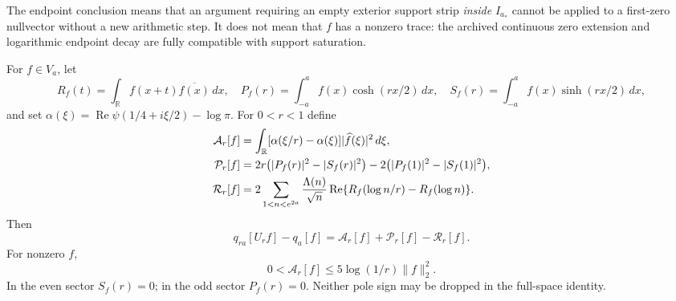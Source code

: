 The endpoint conclusion means that an argument requiring an empty
exterior support strip \emph{inside} $I_{a_*}$ cannot be applied to
a first-zero nullvector without a new arithmetic step. It does not
mean that $f$ has a nonzero trace: the archived continuous zero
extension and logarithmic endpoint decay are fully compatible with
support saturation.

\begin{proposition}
\label{prop:ns55fc-dilation}
For $f\in V_a$, let
\[
 R_f(t)=\int_{\mathbb R}f(x+t)\overline{f(x)}\,dx,
 \quad P_f(r)=\int_{-a}^a f(x)\cosh(rx/2)\,dx,
 \quad S_f(r)=\int_{-a}^a f(x)\sinh(rx/2)\,dx,
\]
and set $\alpha(\xi)=\operatorname{Re}\psi(1/4+i\xi/2)-\log\pi$.
For $0<r<1$ define
\begin{align}
 \mathcal A_r[f]&=\int_{\mathbb R}
    [\alpha(\xi/r)-\alpha(\xi)]|\widehat f(\xi)|^2\,d\xi,
       \label{eq:ns55fc-arch}\\
 \mathcal P_r[f]&=2r\bigl(|P_f(r)|^2-|S_f(r)|^2\bigr)
                  -2\bigl(|P_f(1)|^2-|S_f(1)|^2\bigr),\notag\\
 \mathcal R_r[f]&=2\sum_{1<n<e^{2a}}\frac{\Lambda(n)}{\sqrt n}
          \operatorname{Re}\{R_f(\log n/r)-R_f(\log n)\}.
          \notag
\end{align}
Then
\begin{equation}\label{eq:ns55fc-defect}
 q_{ra}[U_rf]-q_a[f]
       =\mathcal A_r[f]+\mathcal P_r[f]-\mathcal R_r[f].
\end{equation}
For nonzero $f$,
\begin{equation}\label{eq:ns55fc-arch-bound}
 0<\mathcal A_r[f]\le5\log(1/r)\|f\|_2^2.
\end{equation}
In the even sector $S_f(r)=0$; in the odd sector $P_f(r)=0$.
Neither pole sign may be dropped in the full-space identity.
\end{proposition}
